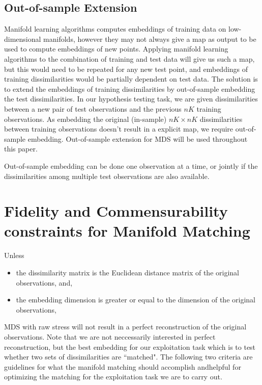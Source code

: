 \documentclass[11pt]{article} %
\begin{document}
\subsection{Out-of-sample Extension}
Manifold learning algorithms computes embeddings of training data on low-dimensional manifolds, however they may not always give a map as output  to  be used to compute embeddings of new points. Applying manifold learning algorithms to the combination  of training and test data  will give us such a map, but this would need to be repeated for any new test point, and embeddings of training dissimilarities would be  partially dependent on test data. The solution is to extend the embeddings of training dissimilarities by out-of-sample embedding the test dissimilarities. 
In our hypothesis testing task, we are given dissimilarities   between a new pair of test observations and the previous $nK$ training observations. As embedding the original (in-sample) $nK \times nK$ dissimilarities between training observations doesn't result in a explicit map, we require out-of-sample embedding.  Out-of-sample extension for MDS will be used throughout this paper\cite{TrossetOOS}. 

Out-of-sample embedding can be done one observation at a time, or jointly if the dissimilarities among multiple test observations are also available. 


\section{Fidelity and Commensurability constraints for Manifold Matching\label{sec:FidComm}}
Unless 
\begin{itemize}
\item the dissimilarity matrix is the Euclidean distance matrix of the original observations, and, 
\item the embedding dimension is greater or equal to the dimension of the original observations,
\end{itemize}
MDS with raw stress will not result in a perfect reconstruction  of the original observations. Note that we are not neccessarily interested in perfect reconstruction, but the best embedding for our exploitation task which is to test whether two sets of dissimilarities are ``matched". The following two criteria  are guidelines for what the manifold matching should accomplish andhelpful for optimizing the matching for the exploitation task we are to carry out.
\end{document}

